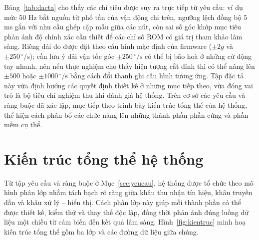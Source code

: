 \documentclass[../DoAn.tex]{subfiles}
\begin{document}
Bảng~\ref{tab:dacta} cho thấy các chỉ tiêu được suy ra trực tiếp từ yêu cầu: ví
dụ mức $50$ Hz bắt nguồn từ phổ tần của vận động chi trên, ngưỡng lệch đồng bộ $5$
ms gắn với nhu cầu ghép cặp mẫu giữa các nút, còn sai số góc khớp mục tiêu phản
ánh độ chính xác cần thiết để các chỉ số ROM có giá trị tham khảo lâm sàng. Riêng dải đo được đặt theo cấu hình mặc định của firmware ($\pm 2g$ và $\pm 250\,^{\circ}/\text{s}$); cần lưu ý dải vận tốc góc $\pm 250\,^{\circ}/\text{s}$ có thể bị bão hoà ở những cử động tay nhanh, nên nếu thực nghiệm cho thấy hiện tượng cắt đỉnh thì có thể nâng lên $\pm 500$ hoặc $\pm 1000\,^{\circ}/\text{s}$ bằng cách đổi thanh ghi cấu hình tương ứng. Tập
đặc tả này vừa định hướng các quyết định thiết kế ở những mục tiếp theo, vừa đóng
vai trò là bộ tiêu chí nghiệm thu khi đánh giá hệ thống. Trên cơ sở các yêu cầu
và ràng buộc đã xác lập, mục tiếp theo trình bày kiến trúc tổng thể của hệ thống,
thể hiện cách phân bổ các chức năng lên những thành phần phần cứng và phần mềm cụ
thể.



\section{Kiến trúc tổng thể hệ thống}
\label{sec:kientruc}

Từ tập yêu cầu và ràng buộc ở Mục~\ref{sec:yeucau}, hệ thống được tổ chức theo mô
hình phân lớp nhằm tách bạch rõ ràng giữa khâu thu nhận tín hiệu, khâu truyền dẫn
và khâu xử lý -- hiển thị. Cách phân lớp này giúp mỗi thành phần có thể được thiết
kế, kiểm thử và thay thế độc lập, đồng thời phản ánh đúng luồng dữ liệu một chiều
từ cảm biến đến kết quả lâm sàng. Hình~\ref{fig:kientruc} minh hoạ kiến trúc tổng
thể gồm ba lớp và các đường dữ liệu giữa chúng.
\end{document}
